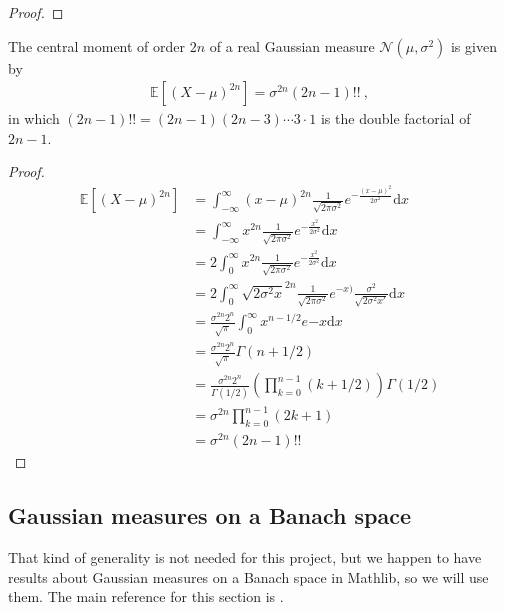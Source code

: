 \begin{proof}\leanok

\end{proof}


\begin{lemma}\label{lem:centralMoment_two_mul_gaussianReal}
  \leanok
The central moment of order $2n$ of a real Gaussian measure $\mathcal{N}(\mu, \sigma^2)$ is given by
\begin{align*}
  \mathbb{E}[(X - \mu)^{2n}] = \sigma^{2n} (2n - 1)!! \: ,
\end{align*}
in which $(2n - 1)!! = (2n - 1)(2n - 3) \cdots 3 \cdot 1$ is the double factorial of $2n - 1$.
\end{lemma}

\begin{proof}\leanok
\begin{align*}
	\mathbb{E}[(X - \mu)^{2n}] &= \int_{-\infty}^\infty (x - \mu)^{2n} \frac{1}{\sqrt{2 \pi \sigma^2}} e^{-\frac{(x - \mu)^2}{2 \sigma^2}} \mathrm dx \\
	&= \int_{-\infty}^\infty x^{2n} \frac{1}{\sqrt{2 \pi \sigma^2}} e^{-\frac{x^2}{2 \sigma^2}} \mathrm dx \\
	&= 2 \int_{0}^\infty x^{2n} \frac{1}{\sqrt{2 \pi \sigma^2}} e^{-\frac{x^2}{2 \sigma^2}} \mathrm dx \\
	&= 2 \int_{0}^\infty {\sqrt{2 \sigma^2 x}}^{2n} \frac{1}{\sqrt{2 \pi \sigma^2}} e^{-x)} \frac{\sigma^2}{\sqrt{2 \sigma^2 x'}} \mathrm dx \\
	&= \frac{\sigma^{2n} 2^n}{\sqrt{\pi}} \int_{0}^\infty x^{n - 1/2} e{-x} \mathrm dx \\
	&= \frac{\sigma^{2n} 2^n}{\sqrt{\pi}} \Gamma(n + 1/2) \\
	&= \frac{\sigma^{2n} 2^n}{\Gamma(1/2)} \left( \prod_{k=0}^{n-1} (k + 1/2) \right) \Gamma(1/2) \\
	&= \sigma^{2n} \prod_{k=0}^{n-1} (2k + 1) \\
	&= \sigma^{2n} (2n - 1)!!
\end{align*}
\end{proof}


\subsection{Gaussian measures on a Banach space}

That kind of generality is not needed for this project, but we happen to have results about Gaussian measures on a Banach space in Mathlib, so we will use them.
The main reference for this section is \cite{hairer2009introduction}.

